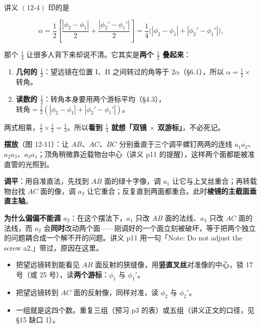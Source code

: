 \documentclass[11pt]{ctexart}
\begin{document}

讲义 $(12\text{-}4)$ 印的是

\[
\alpha=\frac{1}{2}\left[\frac{|\phi_2-\phi_1|}{2}+\frac{|\phi_2'-\phi_1'|}{2}\right]
=\frac{1}{4}\bigl(|\phi_2-\phi_1|+|\phi_2'-\phi_1'|\bigr),
\]

那个 $\frac{1}{4}$ 让很多人背下来却说不清。它其实是\textbf{两个 $\frac{1}{2}$ 叠起来}：

\begin{enumerate}[label=\textbf{第 \arabic* 个 $\tfrac12$}]
\item \textbf{几何的 $\tfrac12$}：望远镜在位置 I、II 之间转过的角等于 $2\alpha$（§6.1），所以 $\alpha=\tfrac12\times$ 转角。
\item \textbf{读数的 $\tfrac12$}：转角本身要用两个游标平均（§4.3），$\text{转角}=\tfrac12(|{\phi_2-\phi_1}|+|{\phi_2'-\phi_1'}|)$。
\end{enumerate}

两式相乘，$\tfrac12\times\tfrac12=\tfrac14$。所以\textbf{看到 $\tfrac14$ 就想「双镜 $\times$ 双游标」}，不必死记。


\textbf{摆放}（图 12-11）：让 $AB$、$AC$、$BC$ 分别垂直于三个调平螺钉两两的连线 $a_1a_2$、$a_2a_3$、$a_3a_1$；顶角稍微靠近载物台中心（讲义 p11 的提醒），这样两个面都能被准直管的光照到。

\textbf{调平}：用自准直法，先找到 $AB$ 面的绿十字像，调 $a_1$ 让它与上叉丝重合；再转载物台找 $AC$ 面的像，调 $a_3$ 让它重合；反复直到两面都重合。此时\textbf{棱镜的主截面垂直主轴}。

\textbf{为什么偏偏不能调 $a_2$}：在这个摆法下，$a_1$ 只改 $AB$ 面的法线、$a_3$ 只改 $AC$ 面的法线，而 $a_2$ 会\textbf{同时}改动两个面——刚调好的一个面立刻被破坏，等于把两个独立的问题耦合成一个解不开的问题。讲义 p11 用一句「Note: Do not adjust the screw a2.」带过，原因在这里。


\begin{itemize}
\item 把望远镜转到能看见 $AB$ 面反射的狭缝像，用\textbf{竖直叉丝}对准像的中心，锁 17 号（或 25 号），读\textbf{两个游标}：$\phi_1$ 与 $\phi_1'$。
\item 把望远镜转到 $AC$ 面的反射像，同样对准，读 $\phi_2$ 与 $\phi_2'$。
\item 一组就是这四个数。重复三组（预习 p3 的表）或五组（讲义正文的口径，见 §15 缺口 1）。
\end{itemize}
\end{document}
